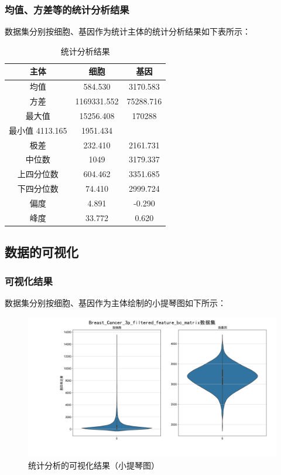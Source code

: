 \documentclass {article}
\begin{document}
		\subsubsection{均值、方差等的统计分析结果}
			数据集分别按细胞、基因作为统计主体的统计分析结果如下表所示：
			\begin{table}[H]
				\centering
				\caption{统计分析结果}
				\begin{tabular}{ccc}
					\hline
					主体    & 细胞            & 基因  \\
					\hline
					均值    & 584.530     & 3170.583       \\
					方差    & 1169331.552 & 75288.716 \\
					最大值   & 15256.408        & 170288       \\
					最小值  4113.165          & 1951.434       \\
					极差    & 232.410        & 2161.731        \\
					中位数   &  1049        & 3179.337            \\
					上四分位数 & 604.462         & 3351.685 \\
					下四分位数 & 74.410          & 2999.724 \\
					偏度    & 4.891         & -0.290 \\
					峰度    & 33.772         & 0.620 \\
					\hline                            
				\end{tabular}
			\end{table}
	
	\subsection{数据的可视化}
		\subsubsection{可视化结果}
			数据集分别按细胞、基因作为主体绘制的小提琴图如下所示：
			\begin{figure}[H]
				\centering
				\includegraphics[width=4.5in]{figures/fig2.png}
				\caption{统计分析的可视化结果（小提琴图）}
			\end{figure}
\end{document}
